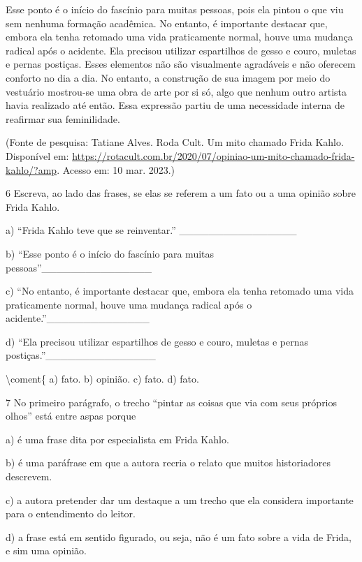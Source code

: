 {Esse ponto é o início do fascínio para muitas pessoas, pois ela pintou o
que viu sem nenhuma formação acadêmica. No entanto, é importante
destacar que, embora ela tenha retomado uma vida praticamente normal,
houve uma mudança radical após o acidente. Ela precisou utilizar
espartilhos de gesso e couro, muletas e pernas postiças. Esses elementos
não são visualmente agradáveis e não oferecem conforto no dia a dia. No
entanto, a construção de sua imagem por meio do vestuário mostrou-se uma
obra de arte por si só, algo que nenhum outro artista havia realizado
até então. Essa expressão partiu de uma necessidade interna de reafirmar
sua feminilidade.

(Fonte de pesquisa: Tatiane Alves. Roda Cult. Um mito chamado Frida
Kahlo. Disponível em:
\url{https://rotacult.com.br/2020/07/opiniao-um-mito-chamado-frida-kahlo/?amp}.
Acesso em: 10 mar. 2023.)

\num{6} Escreva, ao lado das frases, se elas se referem a um fato ou a
uma opinião sobre Frida Kahlo.

a) ``Frida Kahlo teve que se reinventar.''
\_\_\_\_\_\_\_\_\_\_\_\_\_\_\_\_

b) ``Esse ponto é o início do fascínio para muitas
pessoas''\_\_\_\_\_\_\_\_\_\_\_\_\_\_\_

c) ``No entanto, é importante destacar que, embora ela tenha retomado
uma vida praticamente normal, houve uma mudança radical após o
acidente.''\_\_\_\_\_\_\_\_\_\_\_\_\_\_

d) ``Ela precisou utilizar espartilhos de gesso e couro, muletas e
pernas postiças.''\_\_\_\_\_\_\_\_\_\_\_\_\_\_\_

\textbackslash coment\{ a) fato. b) opinião. c) fato. d) fato.

\num{7} No primeiro parágrafo, o trecho ``pintar as coisas que via com
seus próprios olhos'' está entre aspas porque

a) é uma frase dita por especialista em Frida Kahlo.

b) é uma paráfrase em que a autora recria o relato que muitos
historiadores descrevem.

c) a autora pretender dar um destaque a um trecho que ela considera
importante para o entendimento do leitor.

d) a frase está em sentido figurado, ou seja, não é um fato sobre a vida
de Frida, e sim uma opinião.


}
